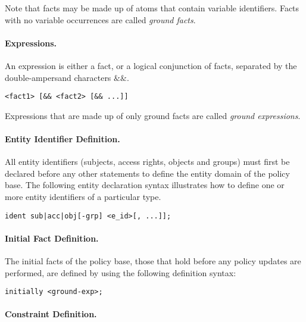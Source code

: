 \documentclass{llncs}
\begin{document}
          Note that facts may be made up of atoms that contain variable
          identifiers. Facts with no variable occurrences are called
          {\em ground facts}.

        \paragraph{Expressions.}
          An expression is either a fact, or a logical conjunction of facts,
          separated by the double-ampersand characters $\&\&$.

          \begin{verbatim}<fact1> [&& <fact2> [&& ...]]\end{verbatim}

          Expressions that are made up of only ground facts are called
          {\em ground expressions}.

        \paragraph{Entity Identifier Definition.}

          All entity identifiers (subjects, access rights, objects and groups)
          must first be declared before any other statements to define the
          entity domain of the policy base. The following entity declaration
          syntax illustrates how to define one or more entity identifiers of a
          particular type.

          \begin{verbatim}ident sub|acc|obj[-grp] <e_id>[, ...]];\end{verbatim}

        \paragraph{Initial Fact Definition.}

          The initial facts of the policy base, those that hold before any
          policy updates are performed, are defined by using the following
          definition syntax:

          \begin{verbatim}initially <ground-exp>;\end{verbatim}

        \paragraph{Constraint Definition.}
\end{document}
